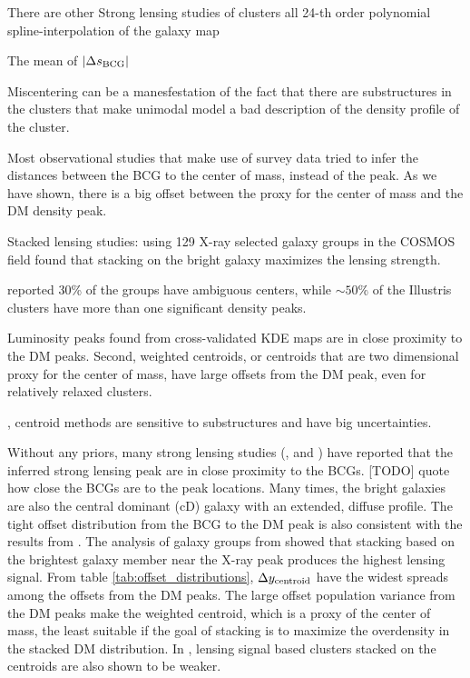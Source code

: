 There are other 
Strong lensing studies of clusters all    
24-th order polynomial spline-interpolation of the galaxy map 

The mean of $|\Delta s_{\rm BCG}|$ 



Miscentering can be a manesfestation of the fact that there are substructures 
in the clusters that make unimodal model a bad description of the density 
profile of the cluster.

Most observational studies that make use of survey data 
tried to infer the distances between the BCG to the
center of mass, instead of the peak.
As we have shown, there is a big offset between the proxy for the center of
mass and the DM density peak. 


Stacked lensing studies:
\cite{George2012a} using 129 X-ray selected galaxy groups in the COSMOS field 
found that stacking on the bright galaxy maximizes the lensing strength. 

\cite{George2012a} reported 
30\% of the groups have ambiguous centers, while $\sim 50\%$ of the Illustris 
clusters have more than one significant density peaks.  



Luminosity peaks found from cross-validated KDE maps  
are in close proximity to the DM peaks. 
Second, weighted centroids, or centroids that are two dimensional proxy for
the center of mass, have large offsets from the DM peak, even for 
relatively relaxed clusters. 

, centroid methods are
sensitive to substructures and have big uncertainties.

\cite{Oguri2010}


Without any priors,
many strong lensing studies (\cite{Zitrin2012}, \cite{Zitrin2012a}
and \cite{Mohammed2014}) have reported that the inferred strong lensing peak are in close
proximity to the BCGs. [TODO] quote how close the BCGs are to the peak locations. 
Many times, the bright galaxies are also the
central dominant (cD) galaxy with an extended, diffuse profile. 
The tight offset distribution from the BCG to the DM peak is also consistent with
the results from \cite{George2012a}.
The analysis of galaxy groups from \cite{George2012a} showed that
stacking based on the brightest galaxy member near the X-ray peak produces 
the highest lensing signal.
From table \ref{tab:offset_distributions}, $\Delta y_{\rm centroid}$ 
have the widest spreads among the offsets from the DM peaks. 
The large offset population variance from the DM peaks make the weighted 
centroid, which is a proxy of the center of mass, the least suitable 
if the goal of stacking is to maximize the overdensity in the stacked DM 
distribution. In \cite{George2012a}, lensing signal based clusters stacked on
the centroids are also shown to be weaker.  




